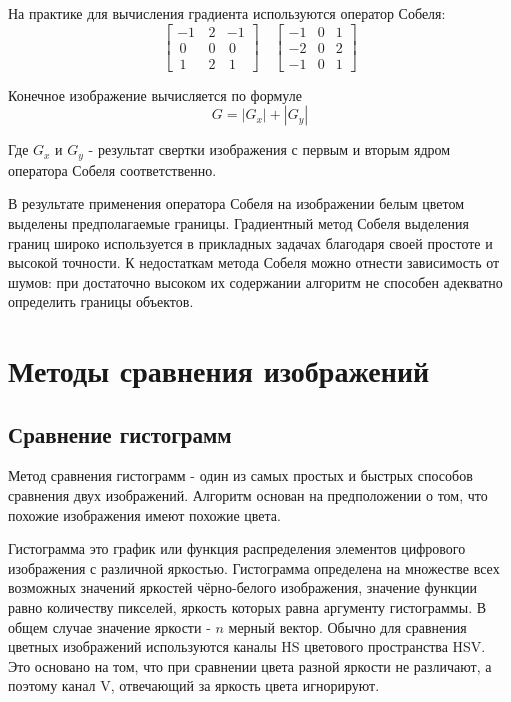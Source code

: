\documentclass[oneside,final,14pt]{extreport}
\begin{document}
На практике для вычисления градиента используются оператор Собеля:
\vspace{3mm}
\begin{equation}
\begin{bmatrix}
 -1 & \,2 & -1 \\
\,0 & \,0 &\,0 \\
\,1 & \,2 &\,1
\end{bmatrix}
\quad
\begin{bmatrix}
-1 & 0 &  1 \\
-2 & 0 &  2 \\
-1 & 0 &  1
\end{bmatrix}	
\end{equation}

\vspace{3mm}Конечное изображение вычисляется 	по формуле
\begin{equation}
G
=
|G_x| + |G_y|
\end{equation}

Где $G_x$ и $G_y$ - результат свертки изображения с первым и вторым ядром оператора Собеля соответственно.
 
В результате применения оператора Собеля на изображении белым цветом выделены предполагаемые границы. Градиентный метод Собеля выделения границ широко используется в прикладных задачах благодаря своей простоте и высокой точности. К недостаткам метода Собеля можно отнести зависимость от шумов: при достаточно высоком их содержании алгоритм не способен адекватно определить границы объектов.



\chapter{Методы сравнения изображений}
\section{Сравнение гистограмм}
Метод сравнения гистограмм - один из самых простых и быстрых способов сравнения  двух изображений. Алгоритм основан на предположении о том, что похожие изображения имеют похожие цвета. 

Гистограмма это график  или функция распределения элементов цифрового изображения с различной яркостью. Гистограмма определена на множестве всех возможных значений яркостей чёрно-белого изображения, значение функции равно количеству пикселей, яркость которых равна аргументу гистограммы. В общем случае значение яркости - $n$ мерный вектор. Обычно для сравнения цветных изображений используются каналы HS цветового пространства HSV. Это основано на том, что при сравнении цвета разной яркости не различают, а поэтому канал V, отвечающий за яркость цвета игнорируют.  
\end{document}
